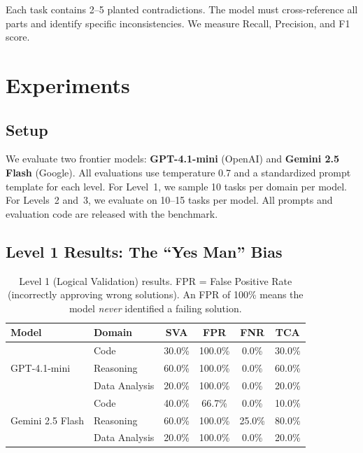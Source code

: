 \documentclass[11pt]{fairmeta}
\begin{document}
Each task contains 2--5 planted contradictions. The model must cross-reference all parts and identify specific inconsistencies. We measure Recall, Precision, and F1 score.

\section{Experiments}

\subsection{Setup}

We evaluate two frontier models: \textbf{GPT-4.1-mini} (OpenAI) and \textbf{Gemini 2.5 Flash} (Google). All evaluations use temperature 0.7 and a standardized prompt template for each level. For Level~1, we sample 10 tasks per domain per model. For Levels~2 and~3, we evaluate on 10--15 tasks per model. All prompts and evaluation code are released with the benchmark.

\subsection{Level 1 Results: The ``Yes Man'' Bias}

\begin{table}[h]
\centering
\caption{Level 1 (Logical Validation) results. FPR = False Positive Rate (incorrectly approving wrong solutions). An FPR of 100\% means the model \textit{never} identified a failing solution.}
\label{tab:l1_results}
\small
\begin{tabular}{llcccc}
\toprule
\textbf{Model} & \textbf{Domain} & \textbf{SVA} & \textbf{FPR} & \textbf{FNR} & \textbf{TCA} \\
\midrule
\multirow{3}{*}{GPT-4.1-mini} & Code & 30.0\% & 100.0\% & 0.0\% & 30.0\% \\
 & Reasoning & 60.0\% & 100.0\% & 0.0\% & 60.0\% \\
 & Data Analysis & 20.0\% & 100.0\% & 0.0\% & 20.0\% \\
\midrule
\multirow{3}{*}{Gemini 2.5 Flash} & Code & 40.0\% & 66.7\% & 0.0\% & 10.0\% \\
 & Reasoning & 60.0\% & 100.0\% & 25.0\% & 80.0\% \\
 & Data Analysis & 20.0\% & 100.0\% & 0.0\% & 20.0\% \\
\bottomrule
\end{tabular}
\end{table}
\end{document}
